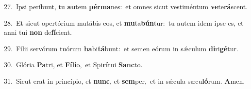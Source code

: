 {\numbfont\textcolor{\numbcolor}{27.}}~Ipsi períbunt, tu \textbf{au}\-tem \textbf{pér}\-\textbf{ma}nes:~\star et omnes sicut vestiméntum \textbf{ve}\-te\-\textbf{rá}\-scent.\par
{\numbfont\textcolor{\numbcolor}{28.}}~Et sicut opertórium mutábis eos, et \textbf{mu}\-ta\-\textbf{bún}\-tur:~\star tu autem idem ipse es, et anni tui \textbf{non} de\-\textbf{fí}\-cient.\par
{\numbfont\textcolor{\numbcolor}{29.}}~Fílii servórum tuórum \textbf{ha}\-bi\-\textbf{tá}\-bunt:~\star et semen eórum in sǽculum \textbf{di}\-ri\-\textbf{gé}\-tur.\par
{\numbfont\textcolor{\numbcolor}{30.}}~Glória \textbf{Pa}\-tri, et \textbf{Fí}\-\textbf{li}o,~\star et Spi\-\textbf{rí}\-tui \textbf{Sanc}\-to.\par
{\numbfont\textcolor{\numbcolor}{31.}}~Sicut erat in princípio, et \textbf{nunc}\-, et \textbf{sem}\-per,~\star et in sǽcula sæcu\-\textbf{ló}\-rum. \textbf{A}\-men.\par
